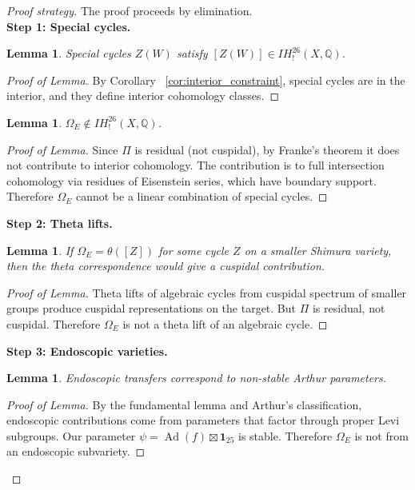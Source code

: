 \documentclass[12pt]{amsart}
\newtheorem{lemma}[theorem]{Lemma}
\theoremstyle{definition}
\DeclareMathOperator\Ad{Ad}
\newcommand{\Q}{\mathbb{Q}}
\newcommand{\IH}{\mathit{IH}}
\begin{document}
\begin{proof}[Proof strategy]
The proof proceeds by elimination.\\

\textbf{Step 1: Special cycles.}
\begin{lemma}
Special cycles $Z(W)$ satisfy $[Z(W)] \in \IH^{26}_!(X, \Q)$.
\end{lemma}
\begin{proof}[Proof of Lemma]
By Corollary ~\ref{cor:interior_constraint}, special cycles are in the interior, and they define interior cohomology classes.
\end{proof}

\begin{lemma}
$\Omega_E \notin \IH^{26}_!(X, \Q)$.
\end{lemma}
\begin{proof}[Proof of Lemma]
Since $\Pi$ is residual (not cuspidal), by Franke's theorem it does not contribute to interior cohomology. The contribution is to full intersection cohomology via residues of Eisenstein series, which have boundary support. Therefore $\Omega_E$ cannot be a linear combination of special cycles.
\end{proof}

\textbf{Step 2: Theta lifts.}
\begin{lemma}
If $\Omega_E = \theta([Z])$ for some cycle $Z$ on a smaller Shimura variety, then the theta correspondence would give a cuspidal contribution.
\end{lemma}
\begin{proof}[Proof of Lemma]
Theta lifts of algebraic cycles from cuspidal spectrum of smaller groups produce cuspidal representations on the target. But $\Pi$ is residual, not cuspidal. Therefore $\Omega_E$ is not a theta lift of an algebraic cycle.
\end{proof}

\textbf{Step 3: Endoscopic varieties.}
\begin{lemma}
Endoscopic transfers correspond to non-stable Arthur parameters.
\end{lemma}
\begin{proof}[Proof of Lemma]
By the fundamental lemma and Arthur's classification, endoscopic contributions come from parameters that factor through proper Levi subgroups. Our parameter $\psi = \Ad(f) \boxtimes \mathbf{1}_{25}$ is stable. Therefore $\Omega_E$ is not from an endoscopic subvariety.
\end{proof}


\end{proof}
\end{document}
